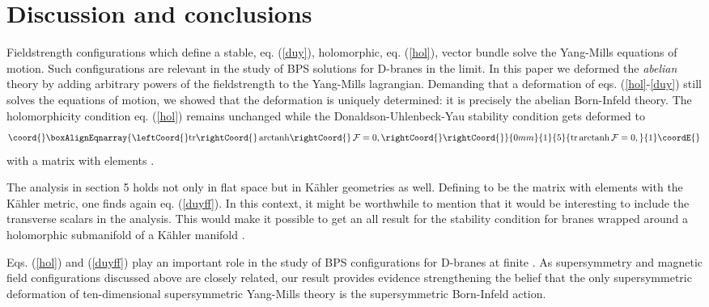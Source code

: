 \documentclass[a4paper,12pt,oneside]{article}
\begin{document}
\setcounter{equation}{0}
\section{Discussion and conclusions}
Fieldstrength configurations which define a stable, eq. (\ref{duy}),
holomorphic, eq. (\ref{hol}), vector bundle solve the Yang-Mills
equations of motion. Such configurations are relevant in the study of BPS
solutions for D-branes in the \coordHE{} limit. In this
paper we deformed the {\it abelian} theory by adding arbitrary powers of
the fieldstrength to the Yang-Mills lagrangian. Demanding that a
deformation of eqs. (\ref{hol}-\ref{duy}) still solves the equations of
motion, we showed that the deformation is uniquely determined: it is
precisely the abelian Born-Infeld theory. The holomorphicity condition
eq. (\ref{hol}) remains unchanged while the Donaldson-Uhlenbeck-Yau
stability condition gets deformed to 
\begin{eqnarray}\coord{}\boxAlignEqnarray{\leftCoord{} \mbox{tr}\rightCoord{}\, {\rm arctanh} \rightCoord{}\, {\cal F}=0,\rightCoord{}\label{duyff} 
\rightCoord{}}{0mm}{1}{5}{ \mbox{tr}\, {\rm arctanh} \, {\cal F}=0,}{1}\coordE{}\end{eqnarray} 
with \coordHE{} a \coordHE{} matrix with elements \coordHE{}. 

The analysis in section 5 holds not only in flat space but in K\"ahler
geometries as well. Defining \coordHE{} to be the \coordHE{} matrix with
elements \coordHE{} with \coordHE{} the K\"ahler metric, one finds again eq.
(\ref{duyff}). In this context, it might be worthwhile to mention that it
would be interesting to include the transverse scalars in the analysis.
This would make it possible to get an all \coordHE{} result for the
stability condition for branes wrapped around a holomorphic submanifold
of a K\"ahler manifold \cite{HM}.

Eqs. (\ref{hol}) and (\ref{duyff}) play an important role in the study of
BPS configurations for D-branes at finite \coordHE{}. As supersymmetry
and magnetic field configurations discussed above are closely related,
our result provides evidence strengthening the belief that the only
supersymmetric deformation of ten-dimensional supersymmetric \coordHE{}
Yang-Mills theory is the supersymmetric Born-Infeld action.
\end{document}
